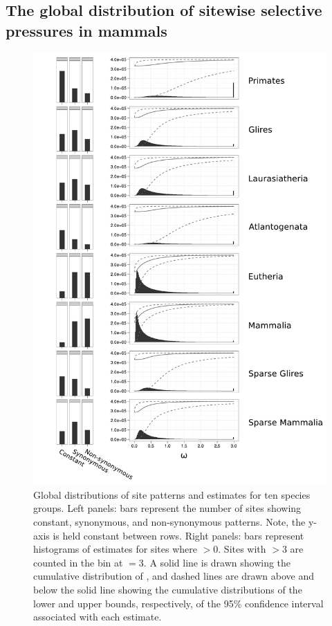 \subsection{The global distribution of sitewise selective pressures in mammals}

\begin{figure}
\centering \includegraphics[scale=0.42]{Figs/global_distributions.pdf}
\caption{\scriptsize Global distributions of site patterns and \omg
  estimates for ten species groups. Left panels: bars represent the
  number of sites showing constant, synonymous, and non-synonymous
  patterns. Note, the y-axis is held constant between rows. Right
  panels: bars represent histograms of \omgml estimates for sites
  where \omgml$>0$. Sites with \omgml$>3$ are counted in the bin at
  \omgml$=3$. A solid line is drawn showing the cumulative
  distribution of \omgml, and dashed lines are drawn above and below
  the solid line showing the cumulative distributions of the lower and
  upper bounds, respectively, of the 95\% confidence interval
  associated with each \sw estimate.}
\label{fig_global_distributions}
\end{figure}

